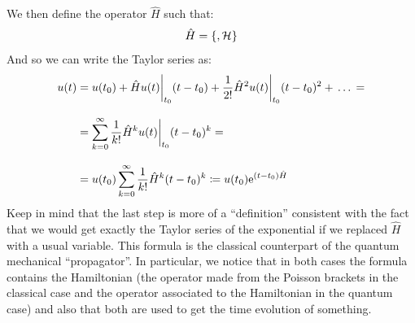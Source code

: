 We then define the operator $\hat{H}$ such that:
\begin{equation}
  \hat{H} = \pb{}{\hamfun}
\end{equation}
And so we can write the Taylor series as:
\begin{equation}
  \begin{split}
    u(t) &= u(t_0) + \hat{H}u(t)\bigg|_{t_0} (t - t_0) + \frac{1}{2!} \hat{H}^2u(t)\bigg|_{t_0} (t - t_0)^2 +  \,\dots\,  =\\[8pt]
    &= \displaystyle\sum_{k=0}^\infty \dfrac{1}{k!} \hat{H}^k u(t)\bigg|_{t_0}(t - t_0)^k =\\[8pt]
    &= u(t_0)\displaystyle\sum_{k=0}^\infty \dfrac{1}{k!} \hat{H}^k (t - t_0)^k \coloneqq u(t_0) \mathrm{e}^{\left(t-t_0\right)\hat{H}}
  \end{split}
\end{equation}
Keep in mind that the last step is more of a ``definition'' consistent with the fact that we would get exactly the Taylor series of the exponential if we replaced $\hat{H}$ with a usual variable.
This formula is the classical counterpart of the quantum mechanical ``propagator''. In particular, we notice that in both cases the formula contains the Hamiltonian (the operator made from the Poisson brackets in the classical case and the operator associated to the Hamiltonian in the quantum case) and also that both are used to get the time evolution of something.

